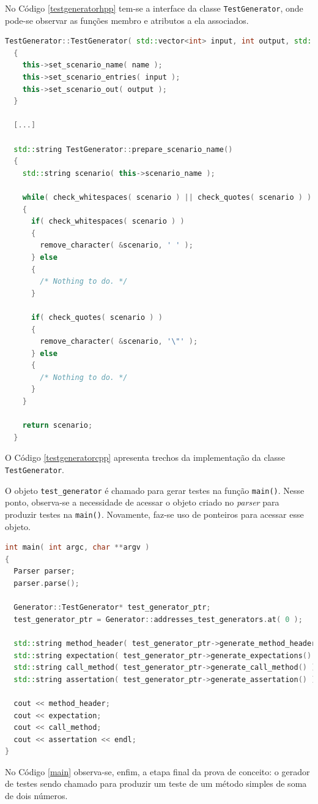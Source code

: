 \par
\indent No Código \ref{testgeneratorhpp} tem-se a interface da classe
\lstinline|TestGenerator|, onde pode-se observar as funções membro e atributos
a ela associados.
\par
\begin{lstlisting}[language=C++, label=testgeneratorcpp, caption=Trecho de implementação da classe TestGenerator]
  TestGenerator::TestGenerator( std::vector<int> input, int output, std::string name )
  {
    this->set_scenario_name( name );
    this->set_scenario_entries( input );
    this->set_scenario_out( output );
  }

  [...]

  std::string TestGenerator::prepare_scenario_name()
  {
    std::string scenario( this->scenario_name );

    while( check_whitespaces( scenario ) || check_quotes( scenario ) )
    {
      if( check_whitespaces( scenario ) )
      {
        remove_character( &scenario, ' ' );
      } else
      {
        /* Nothing to do. */
      }

      if( check_quotes( scenario ) )
      {
        remove_character( &scenario, '\"' );
      } else
      {
        /* Nothing to do. */
      }
    }

    return scenario;
  }
\end{lstlisting}
\par
\indent O Código \ref{testgeneratorcpp} apresenta trechos da implementação da
classe \lstinline|TestGenerator|.
\par
\indent O objeto \lstinline|test_generator| é chamado para gerar testes na função
\lstinline|main()|. Nesse ponto, observa-se a necessidade de acessar o objeto
criado no \textit{parser} para produzir testes na \lstinline|main()|. Novamente,
faz-se uso de ponteiros para acessar esse objeto.
\begin{lstlisting}[language=C++, label=main, caption=função \lstinline|main()| Fazendo Uso da \lstinline|TestGenerator|]
int main( int argc, char **argv )
{
  Parser parser;
  parser.parse();

  Generator::TestGenerator* test_generator_ptr;
  test_generator_ptr = Generator::addresses_test_generators.at( 0 );

  std::string method_header( test_generator_ptr->generate_method_header() );
  std::string expectation( test_generator_ptr->generate_expectations() );
  std::string call_method( test_generator_ptr->generate_call_method() );
  std::string assertation( test_generator_ptr->generate_assertation() );

  cout << method_header;
  cout << expectation;
  cout << call_method;
  cout << assertation << endl;
}
\end{lstlisting}
\par
\indent No Código \ref{main} observa-se, enfim, a etapa final da prova de conceito:
o gerador de testes sendo chamado para produzir um teste de um método simples de
soma de dois números.

